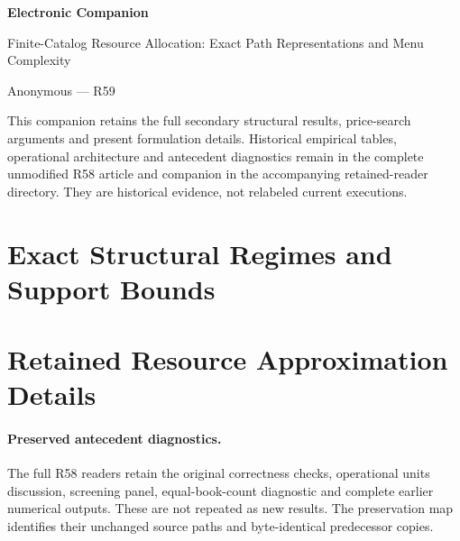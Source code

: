 \documentclass[11pt,letterpaper]{article}
\theoremstyle{definition}\newtheorem{remark}[theorem]{Remark}
\begin{document}
\begin{center}{\Large\bfseries Electronic Companion}\par Finite-Catalog Resource Allocation: Exact Path Representations and Menu Complexity\par Anonymous --- R59\end{center}
This companion retains the full secondary structural results, price-search arguments and present formulation details. Historical empirical tables, operational architecture and antecedent diagnostics remain in the complete unmodified R58 article and companion in the accompanying retained-reader directory. They are historical evidence, not relabeled current executions.
\section{Exact Structural Regimes and Support Bounds}










\section{Retained Resource Approximation Details}

\paragraph{Preserved antecedent diagnostics.} The full R58 readers retain the original correctness checks, operational units discussion, screening panel, equal-book-count diagnostic and complete earlier numerical outputs. These are not repeated as new results. The preservation map identifies their unchanged source paths and byte-identical predecessor copies.
\clearpage

\end{document}
